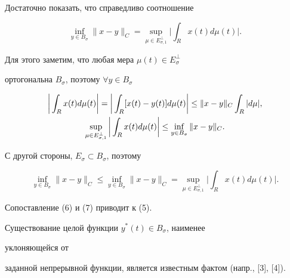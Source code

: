  


\begin{pf} 


Достаточно показать, что справедливо соотношение 


$$ 


\inf_{y\in B_\sigma}\|x-y\|_C=\sup_{\mu\in E^\bot_{\sigma,1}} 


\bigg|\int_R x(t)d\mu(t)\bigg|. 


$$ 


Для этого заметим, что любая мера $\mu(t)\in E^\bot_\sigma$ 


ортогональна $B_\sigma$, поэтому $\forall y\in B_\sigma$ 


\begin{gather} 


\bigg|\int_R x(t)d\mu(t)\bigg|= 


\bigg|\int_R [x(t)-y(t)]d\mu(t)\bigg|\le 


\|x-y\|_C \int_R|d\mu|,\notag \\ 


% 


\sup_{\mu\in E^\bot_{\sigma,1}} 


\bigg|\int_R x(t)d\mu(t) \bigg|\le\inf_{y\in B_\sigma} 


\|x-y\|_C. 


\end{gather} 


 


С другой стороны, $E_\sigma\subset B_\sigma$, поэтому 


\begin{equation} 


\inf_{y\in B_\sigma}\|x-y\|_C\le\inf_{y\in B_\sigma} 


\|x-y\|_C=\sup_{\mu\in E^\bot_{\sigma,1}} 


\bigg|\int_R x(t)d\mu(t)\bigg|. 


\end{equation} 


Сопоставление (6) и (7) приводит к (5). 


\end{pf} 


 


Существование целой функции $y^*(t)\in B_\sigma$, наименее 


уклоняющейся от 


заданной непрерывной функции, является известным фактом (напр., [3], [4]). 


